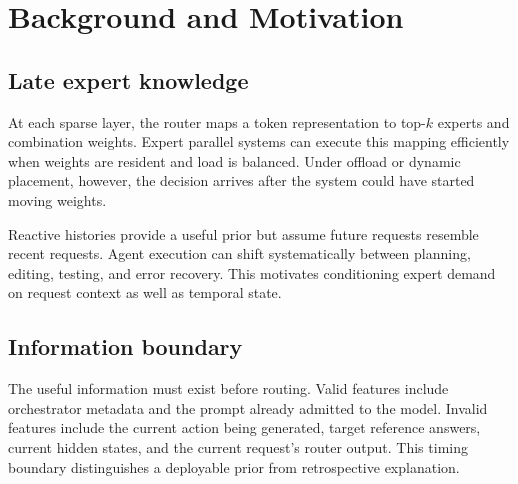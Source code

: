 \section{Background and Motivation}

\subsection{Late expert knowledge}

At each sparse layer, the router maps a token representation to top-$k$
experts and combination weights. Expert parallel systems can execute this
mapping efficiently when weights are resident and load is balanced. Under
offload or dynamic placement, however, the decision arrives after the system
could have started moving weights.

Reactive histories provide a useful prior but assume future requests resemble
recent requests. Agent execution can shift systematically between planning,
editing, testing, and error recovery. This motivates conditioning expert demand
on request context as well as temporal state.

\subsection{Information boundary}

The useful information must exist before routing. Valid features include
orchestrator metadata and the prompt already admitted to the model. Invalid
features include the current action being generated, target reference answers,
current hidden states, and the current request's router output. This timing
boundary distinguishes a deployable prior from retrospective explanation.
